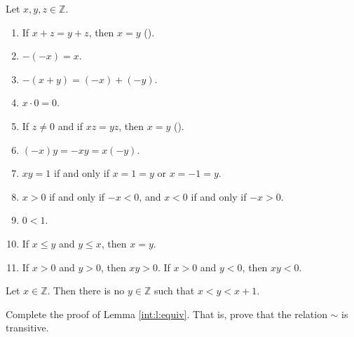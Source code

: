 \begin{theorem} %
	\label{int:t:neg_zero_props}

	Let $x, y, z \in \mathbb{Z}$.
	\begin{enumerate}
		\item {}
		      If $x + z = y + z$, then $x = y$ \quad ().
		\item \label{int:t:neg_zero_props:2}
		      $-(-x) = x$.
		\item \label{int:t:neg_zero_props:3}
		      $-(x + y) = (-x) + (-y)$.
		\item \label{int:t:neg_zero_props:4}
		      $x \cdot 0 = 0$.
		\item {}
		      If $z \neq 0$ and if $x z = y z$, then $x = y$ \quad ().
		\item \label{int:t:neg_zero_props:6}
		      $(-x) y = -x y = x(-y)$.
		\item \label{int:t:neg_zero_props:7}
		      $x y = 1$ if and only if $x = 1 = y$ or $x = -1 = y$.
		\item \label{int:t:neg_zero_props:8}
		      $x > 0$ if and only if $-x < 0$, and $x < 0$ if and only if $-x > 0$.
		\item \label{int:t:neg_zero_props:9}
		      $0 < 1$.
		\item \label{int:t:neg_zero_props:10}
		      If $x \leq y$ and $y \leq x$, then $x = y$.
		\item \label{int:t:neg_zero_props:11}
		      If $x > 0$ and $y > 0$, then $x y > 0 .$ If $x > 0$ and $y < 0$, then $x y < 0$.
	\end{enumerate}
\end{theorem}

\begin{theorem} %
	\label{int:t:discrete}
	Let $x \in \mathbb{Z}$. Then there is no $y \in \mathbb{Z}$ such that $x < y < x + 1$.
\end{theorem}


\addtocounter{exercise}{1}
\Newpage
\begin{exercise} %
	Complete the proof of Lemma \ref{int:l:equiv}. That is, prove that the relation $\sim$ is transitive.
\end{exercise}

